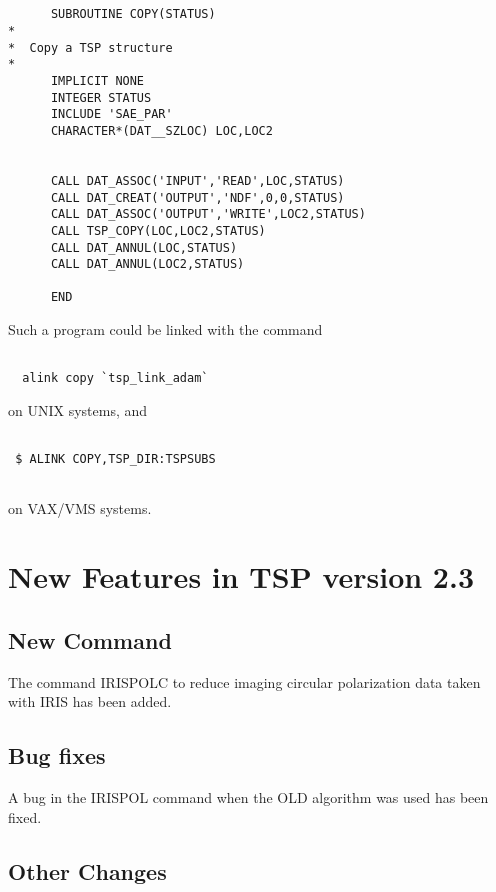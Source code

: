 \begin{verbatim}


      SUBROUTINE COPY(STATUS)
*
*  Copy a TSP structure
*
      IMPLICIT NONE
      INTEGER STATUS
      INCLUDE 'SAE_PAR'
      CHARACTER*(DAT__SZLOC) LOC,LOC2


      CALL DAT_ASSOC('INPUT','READ',LOC,STATUS)
      CALL DAT_CREAT('OUTPUT','NDF',0,0,STATUS)
      CALL DAT_ASSOC('OUTPUT','WRITE',LOC2,STATUS)
      CALL TSP_COPY(LOC,LOC2,STATUS)
      CALL DAT_ANNUL(LOC,STATUS)
      CALL DAT_ANNUL(LOC2,STATUS)

      END       

\end{verbatim}

Such a program could be linked with the command

\begin{verbatim}

  alink copy `tsp_link_adam`
\end{verbatim}
on UNIX systems, and

                                        
\begin{verbatim}

 $ ALINK COPY,TSP_DIR:TSPSUBS
                
\end{verbatim}
on VAX/VMS systems.

\section{New Features in TSP version 2.3}

\subsection{New Command}

The command IRISPOLC to reduce imaging circular polarization data taken with 
IRIS has been added.

\subsection{Bug fixes}

A bug in the IRISPOL command when the OLD algorithm was used has been fixed.

\subsection{Other Changes}

